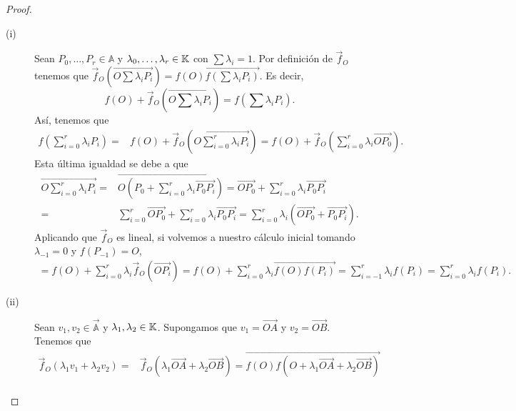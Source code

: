 \begin{proof}
\begin{description}
\item[(i)] Sean $\displaystyle P_{0}, \ldots, P_{r} \in \mathbb{A} $ y $\displaystyle \lambda_{0}, \ldots, \lambda_{r} \in \mathbb{K} $ con $\displaystyle \sum \lambda_{i} = 1 $. Por definición de $\displaystyle \vec{f}_{O} $ tenemos que $\displaystyle \vec{f}_{O}\left(\overrightarrow{O\sum\lambda_{i}P_{i}}\right) = \overrightarrow{f\left(O\right)f\left(\sum\lambda_{i}P_{i}\right)} $. Es decir, 
	\[f\left(O\right) + \vec{f}_{O}\left(\overrightarrow{O\sum\lambda_{i}P_{i}}\right) = f\left(\sum\lambda_{i}P_{i}\right) .\]
Así, tenemos que
\[
\begin{split}
	f\left(\sum^{r}_{i = 0}\lambda_{i}P_{i}\right) = & f\left(O\right) + \vec{f}_{O}\left(\overrightarrow{O\sum^{r}_{i = 0}\lambda_{i}P_{i}}\right) = f\left(O\right) + \vec{f}_{O}\left(\sum^{r}_{i = 0}\lambda_{i}\overrightarrow{OP_{0}}\right)  .
\end{split}
\]
Esta última igualdad se debe a que
\[
\begin{split}
	\overrightarrow{O\sum^{r}_{i = 0}\lambda_{i}P_{i}} = & \overrightarrow{O\left(P_{0}+\sum^{r}_{i = 0}\lambda_{i}\overrightarrow{P_{0}P_{i}}\right)} = \overrightarrow{OP_{0}} + \sum^{r}_{ i= 0}\lambda_{i}\overrightarrow{P_{0}P_{i}} \\
	= & \sum^{r}_{i = 0}\overrightarrow{OP_{0}} + \sum^{r}_{i = 0}\lambda_{i}\overrightarrow{P_{0}P_{i}} = \sum^{r}_{i = 0}\lambda_{i}\left(\overrightarrow{OP_{0}}+\overrightarrow{P_{0}P_{i}}\right) .
\end{split}
\]
Aplicando que $\displaystyle \vec{f}_{O} $ es lineal, si volvemos a nuestro cálculo inicial tomando $\displaystyle \lambda_{-1} = 0 $ y $\displaystyle f\left(P_{-1}\right) = O $,
\[
\begin{split}
	=  f\left(O\right) + \sum^{r}_{i = 0}\lambda_{i}\vec{f}_{O}\left(\overrightarrow{OP_{i}}\right) = f\left(O\right) + \sum^{r}_{i = 0}\lambda_{i}\overrightarrow{f\left(O\right)f\left(P_{i}\right)} =\sum^{r}_{i = -1}\lambda_{i}f\left(P_{i}\right) 
=  \sum^{r}_{i = 0}\lambda_{i}f\left(P_{i}\right) .
\end{split}
\]
\item[(ii)] Sean $\displaystyle v_{1}, v_{2} \in \vec{\mathbb{A}} $ y $\displaystyle \lambda_{1},\lambda_{2} \in \mathbb{K} $. Supongamos que $\displaystyle v_{1} = \overrightarrow{OA} $ y $\displaystyle v_{2} = \overrightarrow{OB} $. Tenemos que
	\[
	\begin{split}
		\vec{f}_{O}\left(\lambda_{1}v_{1} +\lambda_{2}v_{2}\right) = & \vec{f}_{O}\left(\lambda_{1}\overrightarrow{OA} + \lambda_{2}\overrightarrow{OB}\right) =  \overrightarrow{f\left(O\right)f\left(O + \lambda_{1}\overrightarrow{OA}+\lambda_{2}\overrightarrow{OB}\right)} \\

\end{split}\]
\end{description}
\end{proof}
